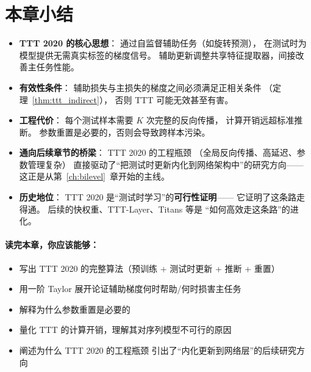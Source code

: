 \section{本章小结}
\label{sec:why_test_time_summary}

\begin{itemize}
  \item \textbf{TTT 2020 的核心思想}：
    通过自监督辅助任务（如旋转预测），
    在测试时为模型提供无需真实标签的梯度信号。
    辅助更新调整共享特征提取器，间接改善主任务性能。

  \item \textbf{有效性条件}：
    辅助损失与主损失的梯度之间必须满足正相关条件
    （定理~\ref{thm:ttt_indirect}），
    否则 TTT 可能无效甚至有害。

  \item \textbf{工程代价}：
    每个测试样本需要 $K$ 次完整的反向传播，
    计算开销远超标准推断。
    参数重置是必要的，否则会导致跨样本污染。

  \item \textbf{通向后续章节的桥梁}：
    TTT 2020 的工程瓶颈
    （全局反向传播、高延迟、参数管理复杂）
    直接驱动了``把测试时更新内化到网络架构中''的研究方向——
    这正是从第~\ref{ch:bilevel}~章开始的主线。

  \item \textbf{历史地位}：
    TTT 2020 是``测试时学习''的\textbf{可行性证明}——
    它证明了这条路走得通。
    后续的快权重、TTT-Layer、Titans 等是
    ``如何高效走这条路''的进化。
\end{itemize}

\paragraph{读完本章，你应该能够：}
\begin{itemize}
  \item 写出 TTT 2020 的完整算法（预训练 + 测试时更新 + 推断 + 重置）
  \item 用一阶 Taylor 展开论证辅助梯度何时帮助/何时损害主任务
  \item 解释为什么参数重置是必要的
  \item 量化 TTT 的计算开销，理解其对序列模型不可行的原因
  \item 阐述为什么 TTT 2020 的工程瓶颈
        引出了``内化更新到网络层''的后续研究方向
\end{itemize}
